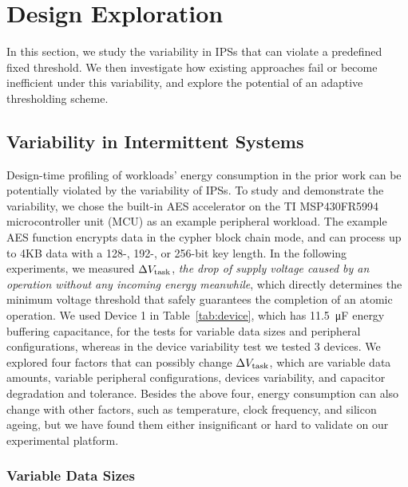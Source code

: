 \section{Design Exploration} 
\label{sec:design_exploration}

In this section, we study the variability in IPSs that can violate a predefined fixed threshold. 
We then investigate how existing approaches fail or become inefficient under this variability, and explore the potential of an adaptive thresholding scheme. 

\subsection{Variability in Intermittent Systems} 
\label{subsec:dynamic_energy_consumption}
 
Design-time profiling of workloads' energy consumption in the prior work can be potentially violated by the variability of IPSs.
To study and demonstrate the variability, we chose the built-in AES accelerator on the TI MSP430FR5994 microcontroller unit (MCU) as an example peripheral workload.  
The example AES function encrypts data in the cypher block chain mode, and can process up to 4KB data with a 128-, 192-, or 256-bit key length. 
In the following experiments, we measured $\Delta V_{\text{task}}$, \textit{the drop of supply voltage caused by an operation without any incoming energy meanwhile}, which directly determines the minimum voltage threshold that safely guarantees the completion of an atomic operation. 
We used Device 1 in Table~\ref{tab:device}, which has \SI{11.5}{\micro\farad} energy buffering capacitance, for the tests for variable data sizes and peripheral configurations, whereas in the device variability test we tested 3 devices.
We explored four factors that can possibly change $\Delta V_{\text{task}}$, which are variable data amounts, variable peripheral configurations, devices variability, and capacitor degradation and tolerance. 
Besides the above four, energy consumption can also change with other factors, such as temperature, clock frequency, and silicon ageing, but we have found them either insignificant or hard to validate on our experimental platform. 




\subsubsection{Variable Data Sizes}

